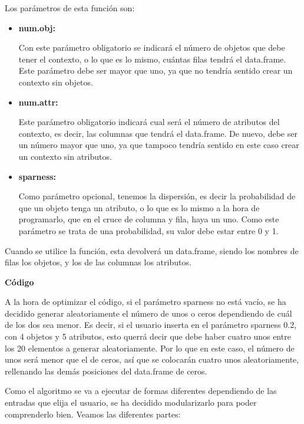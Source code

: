     Los par\'ametros de esta funci\'on son:

    \begin{itemize}
        \item \textbf{num.obj:}

        Con este par\'ametro obligatorio se indicar\'a el n\'umero de objetos que debe tener el contexto, o lo que es lo mismo, 
        cu\'antas filas tendr\'a el data.frame. Este par\'ametro debe ser mayor que uno, 
        ya que no tendr\'ia sentido crear un contexto sin objetos.


        \item \textbf{num.attr:}

        Este par\'ametro obligatorio indicar\'a cual ser\'a el n\'umero de atributos del contexto, es decir, las columnas que tendr\'a el 
        data.frame. De nuevo, debe ser un n\'umero mayor que uno, ya que tampoco tendr\'ia sentido en este caso crear un contexto sin 
        atributos.

        \item \textbf{sparness:}

        Como par\'ametro opcional, tenemos la dispersi\'on, es decir la probabilidad de que un objeto tenga un atributo, o lo que es 
        lo mismo a la hora de programarlo, que en el cruce de columna y fila, haya un uno.
        Como este par\'ametro se trata de una probabilidad, su valor debe estar entre 0 y 1.

    \end{itemize}


    Cuando se utilice la funci\'on, esta devolver\'a un data.frame, siendo los nombres de filas los objetos, y los de las columnas 
    los atributos.


    \bigskip

    \textbf{C\'odigo}

    A la hora de optimizar el c\'odigo, si el par\'ametro sparness no est\'a vac\'io, se ha decidido generar aleatoriamente el n\'umero de 
    unos o ceros dependiendo de cu\'al de los dos sea menor. Es decir, si el usuario inserta en el par\'ametro sparness 0.2, con 4 objetos 
    y 5 atributos, esto querr\'a decir que debe haber cuatro unos entre los 20 elementos a generar aleatoriamente. Por lo que en este caso, 
    el n\'umero de unos ser\'a menor que el de ceros, as\'i que se colocar\'an cuatro unos aleatoriamente, rellenando las dem\'as posiciones 
    del data.frame de ceros.

    Como el algoritmo se va a ejecutar de formas diferentes dependiendo de las entradas que elija el usuario, se ha decidido modularizarlo 
    para poder comprenderlo bien. Veamos las diferentes partes:

